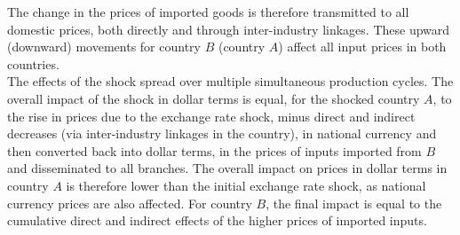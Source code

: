 \documentclass[12pt,a4paper]{paper}
\begin{document}
The change in the prices of imported goods is therefore transmitted to all domestic prices, both directly and through inter-industry linkages. 
These upward (downward) movements for country $B$ (country $A$) affect all input prices in both countries.\\
The effects of the shock spread over multiple simultaneous production cycles. The overall impact of the shock in dollar terms is equal, for the shocked country $A$, to the rise in prices due to the exchange rate shock, minus direct and indirect decreases (via inter-industry linkages in the country), in national currency and then converted back into dollar terms, in the prices of inputs imported from $B$ and disseminated to all branches. 
The overall impact on prices in dollar terms in country $A$ is therefore lower than the initial exchange rate shock, as national currency prices are also affected. 
For country $B$, the final impact is equal to the cumulative direct and indirect effects of the higher prices of imported inputs.\\
\end{document}
